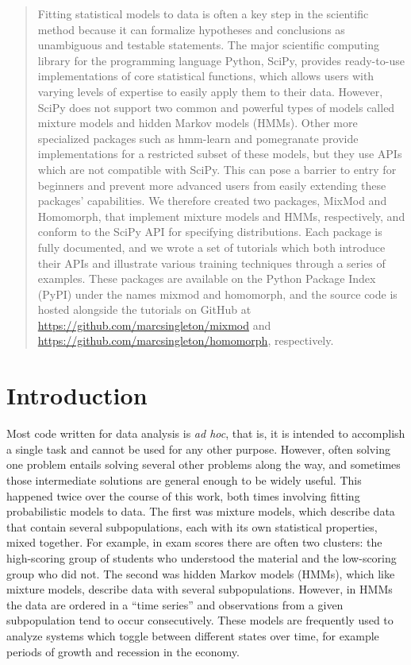 \begin{abstract}
\noindent
Fitting statistical models to data is often a key step in the scientific method because it can formalize hypotheses and conclusions as unambiguous and testable statements. The major scientific computing library for the programming language Python, SciPy, provides ready-to-use implementations of core statistical functions, which allows users with varying levels of expertise to easily apply them to their data. However, SciPy does not support two common and powerful types of models called mixture models and hidden Markov models (HMMs). Other more specialized packages such as hmm-learn and pomegranate provide implementations for a restricted subset of these models, but they use APIs which are not compatible with SciPy. This can pose a barrier to entry for beginners and prevent more advanced users from easily extending these packages' capabilities. We therefore created two packages, MixMod and Homomorph, that implement mixture models and HMMs, respectively, and conform to the SciPy API for specifying distributions. Each package is fully documented, and we wrote a set of tutorials which both introduce their APIs and illustrate various training techniques through a series of examples. These packages are available on the Python Package Index (PyPI) under the names mixmod and homomorph, and the source code is hosted alongside the tutorials on GitHub at \url{https://github.com/marcsingleton/mixmod} and \url{https://github.com/marcsingleton/homomorph}, respectively.
\end{abstract}

\section*{Introduction}
Most code written for data analysis is \textit{ad hoc}, that is, it is intended to accomplish a single task and cannot be used for any other purpose. However, often solving one problem entails solving several other problems along the way, and sometimes those intermediate solutions are general enough to be widely useful. This happened twice over the course of this work, both times involving fitting probabilistic models to data. The first was mixture models, which describe data that contain several subpopulations, each with its own statistical properties, mixed together. For example, in exam scores there are often two clusters: the high-scoring group of students who understood the material and the low-scoring group who did not. The second was hidden Markov models (HMMs), which like mixture models, describe data with several subpopulations. However, in HMMs the data are ordered in a ``time series'' and observations from a given subpopulation tend to occur consecutively. These models are frequently used to analyze systems which toggle between different states over time, for example periods of growth and recession in the economy.

